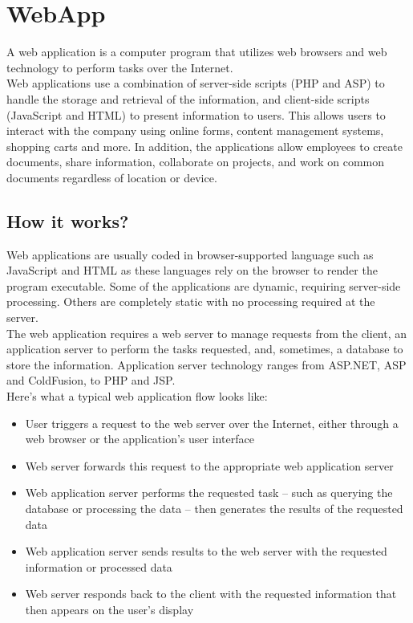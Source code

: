 \section{WebApp}
A web application is a computer program that utilizes web browsers and web technology to perform tasks over the Internet.\\

Web applications use a combination of server-side scripts (PHP and ASP) to handle the storage and retrieval of the information, and client-side scripts (JavaScript and HTML) to present information to users. This allows users to interact with the company using online forms, content management systems, shopping carts and more. In addition, the applications allow employees to create documents, share information, collaborate on projects, and work on common documents regardless of location or device.\\

\subsection{How it works? }
Web applications are usually coded in browser-supported language such as JavaScript and HTML as these languages rely on the browser to render the program executable. Some of the applications are dynamic, requiring server-side processing. Others are completely static with no processing required at the server.\\

The web application requires a web server to manage requests from the client, an application server to perform the tasks requested, and, sometimes, a database to store the information. Application server technology ranges from ASP.NET, ASP and ColdFusion, to PHP and JSP.\\
Here's what a typical web application flow looks like:\\


\begin{itemize}
  \item User triggers a request to the web server over the Internet, either through a web browser or the application’s user interface

  \item Web server forwards this request to the appropriate web application server
  \item Web application server performs the requested task – such as querying the database or processing the data – then generates the results of the requested data
  \item Web application server sends results to the web server with the requested information or processed data

  \item Web server responds back to the client with the requested information that then appears on the user’s display
\end{itemize}\\

